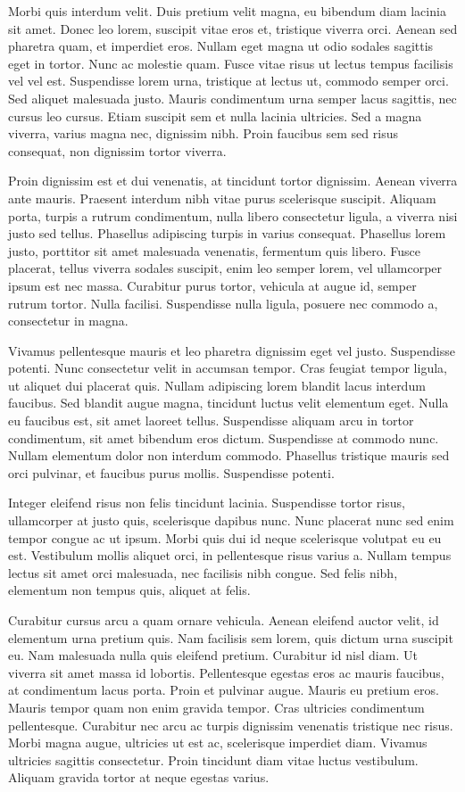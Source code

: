 \documentclass[]{article}
\begin{document}
Morbi quis interdum velit. Duis pretium velit magna, eu bibendum diam lacinia sit amet. Donec leo lorem, suscipit vitae eros et, tristique viverra orci. Aenean sed pharetra quam, et imperdiet eros. Nullam eget magna ut odio sodales sagittis eget in tortor. Nunc ac molestie quam. Fusce vitae risus ut lectus tempus facilisis vel vel est. Suspendisse lorem urna, tristique at lectus ut, commodo semper orci. Sed aliquet malesuada justo. Mauris condimentum urna semper lacus sagittis, nec cursus leo cursus. Etiam suscipit sem et nulla lacinia ultricies. Sed a magna viverra, varius magna nec, dignissim nibh. Proin faucibus sem sed risus consequat, non dignissim tortor viverra.

Proin dignissim est et dui venenatis, at tincidunt tortor dignissim. Aenean viverra ante mauris. Praesent interdum nibh vitae purus scelerisque suscipit. Aliquam porta, turpis a rutrum condimentum, nulla libero consectetur ligula, a viverra nisi justo sed tellus. Phasellus adipiscing turpis in varius consequat. Phasellus lorem justo, porttitor sit amet malesuada venenatis, fermentum quis libero. Fusce placerat, tellus viverra sodales suscipit, enim leo semper lorem, vel ullamcorper ipsum est nec massa. Curabitur purus tortor, vehicula at augue id, semper rutrum tortor. Nulla facilisi. Suspendisse nulla ligula, posuere nec commodo a, consectetur in magna.

Vivamus pellentesque mauris et leo pharetra dignissim eget vel justo. Suspendisse potenti. Nunc consectetur velit in accumsan tempor. Cras feugiat tempor ligula, ut aliquet dui placerat quis. Nullam adipiscing lorem blandit lacus interdum faucibus. Sed blandit augue magna, tincidunt luctus velit elementum eget. Nulla eu faucibus est, sit amet laoreet tellus. Suspendisse aliquam arcu in tortor condimentum, sit amet bibendum eros dictum. Suspendisse at commodo nunc. Nullam elementum dolor non interdum commodo. Phasellus tristique mauris sed orci pulvinar, et faucibus purus mollis. Suspendisse potenti.

Integer eleifend risus non felis tincidunt lacinia. Suspendisse tortor risus, ullamcorper at justo quis, scelerisque dapibus nunc. Nunc placerat nunc sed enim tempor congue ac ut ipsum. Morbi quis dui id neque scelerisque volutpat eu eu est. Vestibulum mollis aliquet orci, in pellentesque risus varius a. Nullam tempus lectus sit amet orci malesuada, nec facilisis nibh congue. Sed felis nibh, elementum non tempus quis, aliquet at felis.

Curabitur cursus arcu a quam ornare vehicula. Aenean eleifend auctor velit, id elementum urna pretium quis. Nam facilisis sem lorem, quis dictum urna suscipit eu. Nam malesuada nulla quis eleifend pretium. Curabitur id nisl diam. Ut viverra sit amet massa id lobortis. Pellentesque egestas eros ac mauris faucibus, at condimentum lacus porta. Proin et pulvinar augue. Mauris eu pretium eros. Mauris tempor quam non enim gravida tempor. Cras ultricies condimentum pellentesque. Curabitur nec arcu ac turpis dignissim venenatis tristique nec risus. Morbi magna augue, ultricies ut est ac, scelerisque imperdiet diam. Vivamus ultricies sagittis consectetur. Proin tincidunt diam vitae luctus vestibulum. Aliquam gravida tortor at neque egestas varius.
\end{document}
